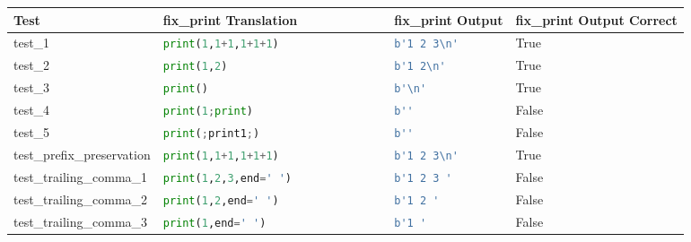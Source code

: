 \begin{table}[h!]
    \centering
    \begin{tabular}{@{}l|lll@{}}
    \toprule
    Test                                  & fix\_print Translation             & fix\_print Output             & fix\_print Output Correct \\ \midrule
    test\_1                               & \lstinline[language=Python, style=pythonstyle]|print(1,1+1,1+1+1)                | & \lstinline[language=Python, style=pythonstyle]|b'1 2 3\n'    | & True                      \\
    test\_2                               & \lstinline[language=Python, style=pythonstyle]|print(1,2)                        | & \lstinline[language=Python, style=pythonstyle]|b'1 2\n'      | & True                      \\
    test\_3                               & \lstinline[language=Python, style=pythonstyle]|print()                           | & \lstinline[language=Python, style=pythonstyle]|b'\n'         | & True                      \\
    test\_4                               & \lstinline[language=Python, style=pythonstyle]|print(1;print)                    | & \lstinline[language=Python, style=pythonstyle]|b''           |                & False                     \\
    test\_5                               & \lstinline[language=Python, style=pythonstyle]|print(;print1;)                   | & \lstinline[language=Python, style=pythonstyle]|b''           |                & False                     \\
    test\_prefix\_preservation            & \lstinline[language=Python, style=pythonstyle]|print(1,1+1,1+1+1)                | & \lstinline[language=Python, style=pythonstyle]|b'1 2 3\n'    | & True                      \\
    test\_trailing\_comma\_1              & \lstinline[language=Python, style=pythonstyle]|print(1,2,3,end=' ')              | & \lstinline[language=Python, style=pythonstyle]|b'1 2 3 '     |                & False                     \\
    test\_trailing\_comma\_2              & \lstinline[language=Python, style=pythonstyle]|print(1,2,end=' ')                | & \lstinline[language=Python, style=pythonstyle]|b'1 2 '       |                & False                     \\
    test\_trailing\_comma\_3              & \lstinline[language=Python, style=pythonstyle]|print(1,end=' ')                  | & \lstinline[language=Python, style=pythonstyle]|b'1 '         |                & False                     \\

\end{tabular}
\end{table}
